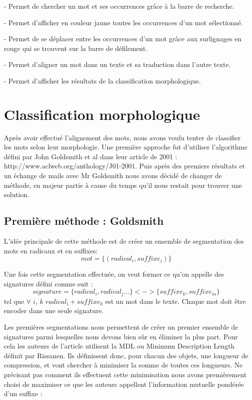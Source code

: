 \documentclass[11pt, oneside]{article}   	%
\begin{document}
 
-	Permet de chercher un mot et ses occurrences grâce à la barre de recherche.

-	Permet d’afficher en couleur jaune toutes les occurrences d’un mot sélectionné. 

-	Permet de se déplacer entre les occurrences d’un mot grâce aux surlignages en rouge qui se trouvent sur la barre de défilement. 

-	 Permet d’aligner un mot dans un texte et sa traduction dans l’autre texte.

-	Permet d’afficher les résultats de la classification morphologique.

\section{Classification morphologique}
Après avoir effectué l'alignement des mots, nous avons voulu tenter de classifier les mots selon leur morphologie. Une première approche fut d'utiliser l'algorithme défini par John Goldsmith et al dans leur article de 2001 : http://www.aclweb.org/anthology/J01-2001. Puis après des premiers résultats et un échange de mails avec Mr Goldsmith nous avons décidé de changer de méthode, en majeur partie à cause du temps qu'il nous restait pour trouver une solution.

\subsection{Première méthode : Goldsmith}
L'idée principale de cette méthode est de créer un ensemble de segmentation des mots en radicaux et en suffixes:
\begin{equation}
mot = \{(radical_{i}, suffixe_{i})\}
\end{equation}

Une fois cette segmentation effectuée, on veut former ce qu'on appelle des signatures défini comme suit : 
\begin{equation}
signature = \{radical_{i}, radical_{j}...\} <-> \{suffixe_{k}, suffixe_{m}\}
\end{equation}
tel que $\forall$ $i$, $k$  $radical_{i} + suffixe_{k}$ est un mot dans le texte. Chaque mot doit être encoder dans une seule signature. 

Les premières segmentations nous permettent de créer un premier ensemble de signatures parmi lesquelles nous devons bien sûr en éliminer la plus part. Pour cela les auteurs de l'article utilisent la MDL ou Minimum Description Length définit par Rissanen. Ils définissent donc, pour chacun des objets, une longueur de compression, et vont chercher à minimiser la somme de toutes ces longueurs. Ne précisant pas comment ils effectuent cette minimisation nous avons premièrement choisi de maximiser ce que les auteurs appellent l'information mutuelle pondérée d'un suffixe : 
\end{document}
